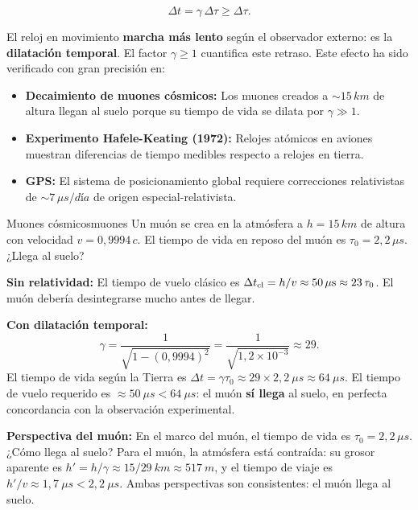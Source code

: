 \begin{equation}
  \Delta t = \gamma\,\Delta\tau \geq \Delta\tau.
  \label{eq:dilatacion}
\end{equation}

El reloj en movimiento \textbf{marcha más lento} según el observador externo: es la \textbf{dilatación temporal}. El factor $\gamma \geq 1$ cuantifica este retraso. Este efecto ha sido verificado con gran precisión en:
\begin{itemize}[leftmargin=2em]
  \item \textbf{Decaimiento de muones cósmicos:} Los muones creados a $\sim 15\,\si{km}$ de altura llegan al suelo porque su tiempo de vida se dilata por $\gamma \gg 1$.
  \item \textbf{Experimento Hafele-Keating (1972):} Relojes atómicos en aviones muestran diferencias de tiempo medibles respecto a relojes en tierra.
  \item \textbf{GPS:} El sistema de posicionamiento global requiere correcciones relativistas de $\sim 7\,\si{\mu s/día}$ de origen especial-relativista.
\end{itemize}

\begin{ejemplo}{Muones cósmicos}{muones}
Un muón se crea en la atmósfera a $h = 15\,\si{km}$ de altura con velocidad $v = 0{,}9994\,c$. El tiempo de vida en reposo del muón es $\tau_0 = 2{,}2\,\si{\mu s}$. ¿Llega al suelo?

\textbf{Sin relatividad:} El tiempo de vuelo clásico es $\Delta t_{\rm cl} = h/v \approx 50\,\si{\mu s} \approx 23\,\tau_0$. El muón debería desintegrarse mucho antes de llegar.

\textbf{Con dilatación temporal:}
\[
  \gamma = \frac{1}{\sqrt{1-(0{,}9994)^2}} = \frac{1}{\sqrt{1{,}2\times10^{-3}}} \approx 29.
\]
El tiempo de vida según la Tierra es $\Delta t = \gamma\tau_0 \approx 29 \times 2{,}2\ \si{\mu s} \approx 64\ \si{\mu s}$. El tiempo de vuelo requerido es $\approx 50\ \si{\mu s} < 64\ \si{\mu s}$: el muón \textbf{sí llega} al suelo, en perfecta concordancia con la observación experimental.

\textbf{Perspectiva del muón:} En el marco del muón, el tiempo de vida es $\tau_0 = 2{,}2\,\si{\mu s}$. ¿Cómo llega al suelo? Para el muón, la atmósfera está contraída: su grosor aparente es $h' = h/\gamma \approx 15/29\ \si{km} \approx 517\ \si{m}$, y el tiempo de viaje es $h'/v \approx 1{,}7\ \si{\mu s} < 2{,}2\ \si{\mu s}$. Ambas perspectivas son consistentes: el muón llega al suelo.
\end{ejemplo}

